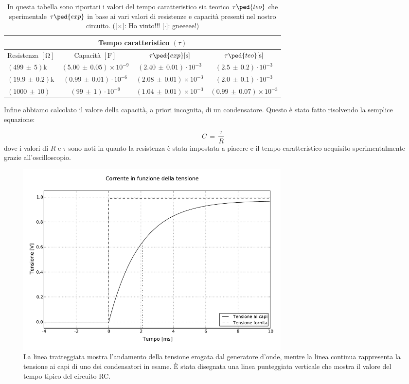 \begin{table}[H]
  \centering
  \begin{tabular}{l | c c c}
      \multicolumn{4}{c}{\textbf{Tempo caratteristico $(\tau)$}} \\
      \toprule
      Resistenza $[\si{\ohm}]$ & Capacità $[\si{\farad}]$ & $\tau\ped{exp} [\si{\second}]$ & $\tau\ped{teo} [\si{\second}]$ \\
      \midrule
      $(499\,\pm\,5)$k   &  $(5.00\,\pm\,0.05)\times10^{-9}$ 	& $ (2.40\,\pm\,0.01)\cdot10^{-3}$ 		& $(2.5\,\pm\,0.2)\cdot10^{-3}$ \\
      $(19.9\,\pm\,0.2)$k  &  $(0.99\,\pm\,0.01)\cdot10^{-6}$ 		& $ (2.08\,\pm\,0.01)\times10^{-3}$ 	& $(2.0\,\pm\,0.1)\cdot10^{-3}$ \\
      $(1000\,\pm\,10)$    &  $(99\,\pm\,1)\cdot10^{-9}$ 		& $ (1.04\,\pm\,0.01)\times10^{-3}$ 	& $(0.99\,\pm\,0.07)\times10^{-3}$ \\
      \bottomrule
  \end{tabular}
  \caption{In questa tabella sono riportati i valori del tempo caratteristico sia teorico $\tau\ped{teo}$ che sperimentale $\tau\ped{exp}$ in base ai vari valori di resistenze e capacità presenti nel nostro circuito. ([$\times$]: Ho vinto!!! [$\cdot$]: gneeeee!)}
  \label{tab:tris}
\end{table}

Infine abbiamo calcolato il valore della capacità, a priori incognita, di un condensatore. Questo è stato fatto risolvendo la semplice equazione:

\begin{equation}
	C \,=\, \frac{\tau}{R}
	\label{eq:cap}
\end{equation}
%
dove i valori di $R$ e $\tau$ sono noti in quanto la resistenza è stata impostata a piacere e il tempo caratteristico acquisito sperimentalmente grazie all'oscilloscopio.

\begin{figure}
    \includegraphics[width=140mm]{fig.pdf}
    \caption{La linea tratteggiata mostra l'andamento della tensione erogata dal generatore d'onde, mentre la linea continua
      rappresenta la tensione ai capi di uno dei condensatori in esame. È stata disegnata una linea punteggiata verticale che mostra il
      valore del tempo tipico del circuito RC.}
\end{figure}
